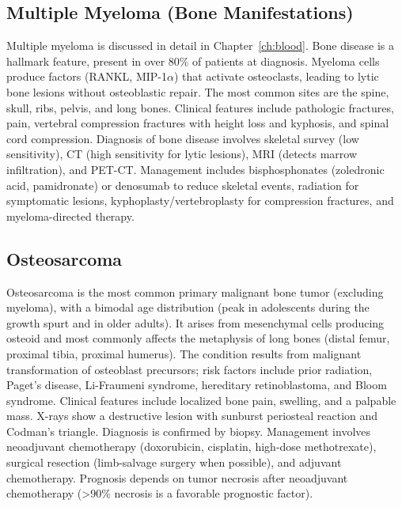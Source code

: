 \subsection{Multiple Myeloma (Bone Manifestations)}
\label{sec:Multiple Myeloma (Bone Manifestations)}
Multiple myeloma is discussed in detail in Chapter~\ref{ch:blood}. Bone disease is a hallmark feature, present in over 80\% of patients at diagnosis. Myeloma cells produce factors (RANKL, MIP-1$\alpha$) that activate osteoclasts, leading to lytic bone lesions without osteoblastic repair. The most common sites are the spine, skull, ribs, pelvis, and long bones. Clinical features include pathologic fractures, pain, vertebral compression fractures with height loss and kyphosis, and spinal cord compression. Diagnosis of bone disease involves skeletal survey (low sensitivity), CT (high sensitivity for lytic lesions), MRI (detects marrow infiltration), and PET-CT. Management includes bisphosphonates (zoledronic acid, pamidronate) or denosumab to reduce skeletal events, radiation for symptomatic lesions, kyphoplasty/vertebroplasty for compression fractures, and myeloma-directed therapy.

\subsection{Osteosarcoma}
\label{sec:Osteosarcoma}
Osteosarcoma is the most common primary malignant bone tumor (excluding myeloma), with a bimodal age distribution (peak in adolescents during the growth spurt and in older adults). It arises from mesenchymal cells producing osteoid and most commonly affects the metaphysis of long bones (distal femur, proximal tibia, proximal humerus). The condition results from malignant transformation of osteoblast precursors; risk factors include prior radiation, Paget's disease, Li-Fraumeni syndrome, hereditary retinoblastoma, and Bloom syndrome. Clinical features include localized bone pain, swelling, and a palpable mass. X-rays show a destructive lesion with sunburst periosteal reaction and Codman's triangle. Diagnosis is confirmed by biopsy. Management involves neoadjuvant chemotherapy (doxorubicin, cisplatin, high-dose methotrexate), surgical resection (limb-salvage surgery when possible), and adjuvant chemotherapy. Prognosis depends on tumor necrosis after neoadjuvant chemotherapy (>90\% necrosis is a favorable prognostic factor).

